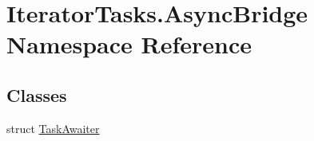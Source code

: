 \hypertarget{namespace_iterator_tasks_1_1_async_bridge}{}\section{Iterator\+Tasks.\+Async\+Bridge Namespace Reference}
\label{namespace_iterator_tasks_1_1_async_bridge}
\subsection*{Classes}
\begin{DoxyCompactItemize}
\item 
struct \hyperlink{struct_iterator_tasks_1_1_async_bridge_1_1_task_awaiter}{Task\+Awaiter}
\end{DoxyCompactItemize}

